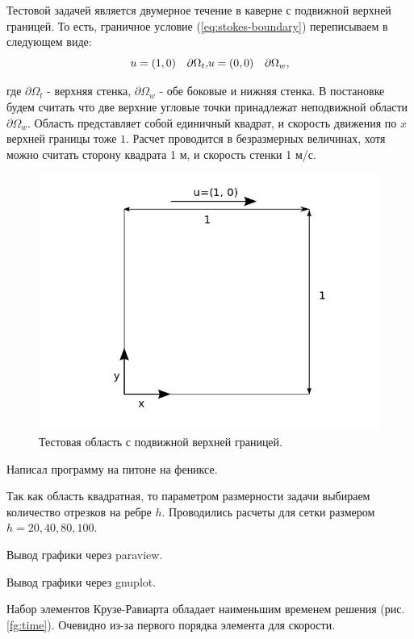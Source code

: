 \documentclass[12pt]{article}
\begin{document}
Тестовой задачей является двумерное течение в каверне с подвижной верхней границей. То есть, граничное условие (\ref{eq:stokes-boundary}) переписываем в следующем виде:
\begin{equation}
u = (1, 0) \quad \partial\Omega_{t},
$$$$
u = (0, 0) \quad \partial\Omega_{w},
\end{equation}

где $\partial\Omega_{t}$ - верхняя стенка, $\partial\Omega_{w}$ - обе боковые и нижняя стенка. В постановке будем считать что две верхние угловые точки принадлежат неподвижной области $\partial\Omega_{w}$. Область представляет собой единичный квадрат, и скорость движения по $x$ верхней границы тоже $1$. Расчет проводится в безразмерных величинах, хотя можно считать сторону квадрата 1 м, и скорость стенки 1 м/с.

\begin{figure}
\includegraphics[scale=0.5]{pics/cavity}
\caption{Тестовая область с подвижной верхней границей.}
\label{fg:cavity}
\end{figure}

Написал программу на питоне на фениксе.

Так как область квадратная, то параметром размерности задачи выбираем количество отрезков на ребре $h$. Проводились расчеты для сетки размером $h=20, 40, 80, 100$. 


Вывод графики через paraview.


Вывод графики через gnuplot.

Набор элементов Крузе-Равиарта обладает наименьшим временем решения (рис. \ref{fg:time}).
Очевидно из-за первого порядка элемента для скорости.
\end{document}
